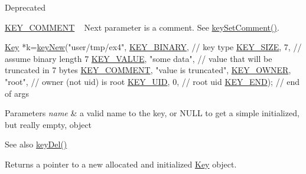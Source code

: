 \begin{DoxyRefDesc}{Deprecated}
\begin{DoxyItemize}
\item \hyperlink{group__key_gga91fb3178848bd682000958089abbaf40ac29427bb47cc31689d02912e36161ee3}{K\+E\+Y\+\_\+\+C\+O\+M\+M\+E\+N\+T} ~\newline
 Next parameter is a comment. See \hyperlink{group__meta_ga8863a877a84fa46e6017fe72e49b89c1}{key\+Set\+Comment()}. 
\begin{DoxyCodeInclude}
\hyperlink{classkdb_1_1Key_a5679f5cae63caddd64a60388b9cc77fa}{Key} *k=\hyperlink{group__key_gad23c65b44bf48d773759e1f9a4d43b89}{keyNew}(\textcolor{stringliteral}{"user/tmp/ex4"},
        \hyperlink{group__key_gga91fb3178848bd682000958089abbaf40a1ca18d4e094ae7487d35ecedda2235ff}{KEY\_BINARY},                   \textcolor{comment}{// key type}
        \hyperlink{group__key_gga91fb3178848bd682000958089abbaf40a6d531b5c41445d19d0452eebdccbfa01}{KEY\_SIZE}, 7,                    \textcolor{comment}{// assume binary length 7}
        \hyperlink{group__key_gga91fb3178848bd682000958089abbaf40ac66e4a49d09212b79f5754ca6db5bd2e}{KEY\_VALUE}, \textcolor{stringliteral}{"some data"},                \textcolor{comment}{// value that will be truncated in 7 bytes}
        \hyperlink{group__key_gga91fb3178848bd682000958089abbaf40ac29427bb47cc31689d02912e36161ee3}{KEY\_COMMENT}, \textcolor{stringliteral}{"value is truncated"},
        \hyperlink{group__key_gga91fb3178848bd682000958089abbaf40a77ca60362fa8daca8d5347db4385068b}{KEY\_OWNER}, \textcolor{stringliteral}{"root"},             \textcolor{comment}{// owner (not uid) is root}
        \hyperlink{group__key_gga91fb3178848bd682000958089abbaf40a28f01a87d65f065172f734c9c9446c0e}{KEY\_UID}, 0,                      \textcolor{comment}{// root uid}
        \hyperlink{group__key_gga91fb3178848bd682000958089abbaf40aa8adb6fcb92dec58fb19410eacfdd403}{KEY\_END});                        \textcolor{comment}{// end of args}
\end{DoxyCodeInclude}

\end{DoxyItemize}\end{DoxyRefDesc}



\begin{DoxyParams}{Parameters}
{\em name} & a valid name to the key, or N\+U\+L\+L to get a simple initialized, but really empty, object \\
\hline
\end{DoxyParams}
\begin{DoxySeeAlso}{See also}
\hyperlink{group__key_ga3df95bbc2494e3e6703ece5639be5bb1}{key\+Del()} 
\end{DoxySeeAlso}
\begin{DoxyReturn}{Returns}
a pointer to a new allocated and initialized \hyperlink{classkdb_1_1Key}{Key} object. 
\end{DoxyReturn}

